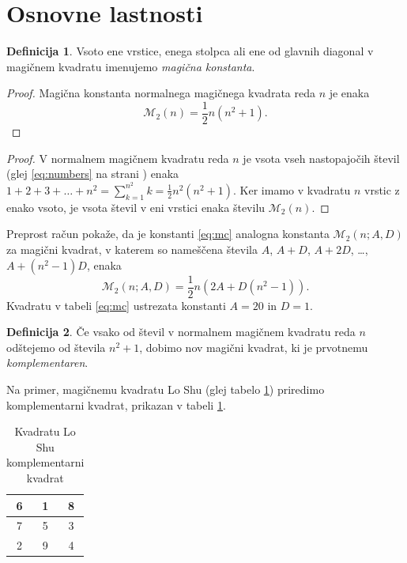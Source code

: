 \documentclass[a4paper,12pt]{article}
\newcommand{\m}{\mathcal{M}_2}
\newcommand{\pojem}[1]{\emph{\color{purple}#1}}
\theoremstyle{definition}
\newtheorem{definicija}{Definicija}
\theoremstyle{plain}
\newenvironment{magic}[3]{\begin{table}[!ht]
   \centering
   \caption{#2}
   \label{#3}
   \large
   \begin{tabular}{*{#1}{c|}}
   \hline}{\end{tabular}
   \normalsize
\end{table}}
\begin{document}

\section{Osnovne lastnosti}

\begin{definicija}
   Vsoto ene vrstice, enega stolpca ali ene od glavnih diagonal
   v magičnem kvadratu imenujemo \pojem{magična konstanta}.
\end{definicija}

\begin{proof}
   Magična konstanta normalnega magičnega kvadrata reda \(n\)
   je enaka
   \begin{equation}
      \label{eq:mc}
      \m(n) = \frac{1}{2} n(n^2+1).
   \end{equation}
\end{proof}

\begin{proof}
   V normalnem magičnem kvadratu reda \(n\) je vsota vseh nastopajočih
   števil (glej \eqref{eq:numbers} na strani \pageref{eq:numbers}) enaka
   \(1+2+3+\ldots+n^2=\sum_{k=1}^{n^2}k=\frac{1}{2}n^2(n^2+1)\). Ker imamo
   v kvadratu \(n\) vrstic z enako vsoto, je vsota števil v eni vrstici
   enaka številu \(\m(n)\).
\end{proof}

Preprost račun pokaže, da je konstanti \eqref{eq:mc} analogna konstanta
\(\m(n;A,D)\) za magični kvadrat, v katerem so nameščena števila
\(A\), \(A+D\), \(A+2D\), \ldots, \(A+(n^2-1)D\), enaka
\[
   \m(n;A,D) = \frac{1}{2} n \left(2A+D(n^2-1)\right).
\]
Kvadratu v tabeli \ref{eq:mc} ustrezata konstanti \(A=20\) in \(D=1\).

\begin{definicija}
   Če vsako od števil v normalnem magičnem kvadratu reda \(n\) odštejemo
   od števila \(n^2+1\), dobimo nov magični kvadrat, ki je prvotnemu
   \pojem{komplementaren}.
\end{definicija}

Na primer, magičnemu kvadratu Lo Shu (glej tabelo \ref{table:closhu}) priredimo
komplementarni kvadrat, prikazan v tabeli \ref{table:closhu}.
%

\begin{magic}{3}{Kvadratu Lo Shu komplementarni kvadrat}{table:closhu}
       6 & 1 & 8 \\\hline
       7 & 5 & 3 \\\hline
       2 & 9 & 4 \\\hline
\end{magic}
\end{document}
